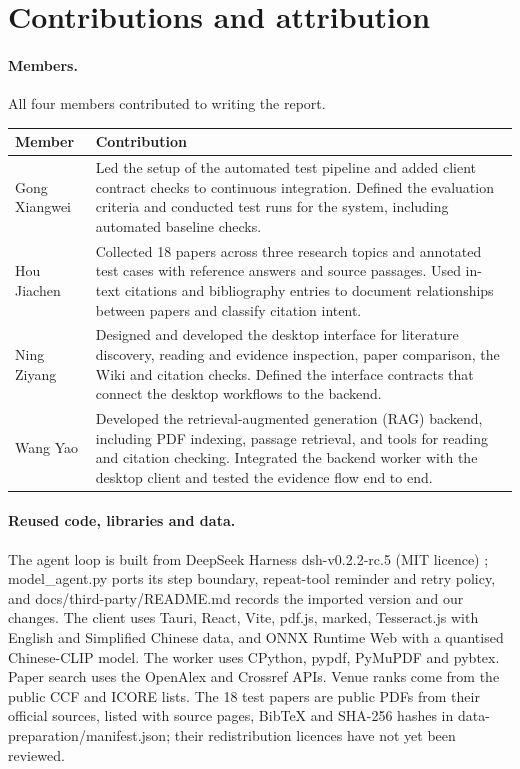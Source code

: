 \documentclass{article}
\newcommand{\code}[1]{{\ttfamily\small\hyphenchar\font=-1\relax #1}}
\begin{document}
\section{Contributions and attribution}
\label{sec:contrib}

\paragraph{Members.} All four members contributed to writing the report.

\medskip
{%
  \small
  \noindent\begin{tabularx}{\linewidth}{@{}lY@{}}
    \toprule
    Member & Contribution \\
    \midrule
    Gong Xiangwei & Led the setup of the automated test pipeline and added client contract checks to
    continuous integration. Defined the evaluation criteria and conducted test runs for the system,
    including automated baseline checks. \\
    Hou Jiachen & Collected 18 papers across three research topics and annotated test cases with
    reference answers and source passages. Used in-text citations and bibliography entries to
    document relationships between papers and classify citation intent. \\
    Ning Ziyang & Designed and developed the desktop interface for literature discovery, reading
    and evidence inspection, paper comparison, the Wiki and citation checks. Defined the interface
    contracts that connect the desktop workflows to the backend. \\
    Wang Yao & Developed the retrieval-augmented generation (RAG) backend, including PDF indexing,
    passage retrieval, and tools for reading and citation checking. Integrated the backend worker
    with the desktop client and tested the evidence flow end to end. \\
    \bottomrule
  \end{tabularx}\par
}

\paragraph{Reused code, libraries and data.}
The agent loop is built from DeepSeek Harness \code{dsh-v0.2.2-rc.5} (MIT licence) \citep{dsh};
\code{model\_agent.py} ports its step boundary, repeat-tool reminder and retry policy, and
\code{docs/third-party/README.md} records the imported version and our changes. The client uses Tauri,
React, Vite, pdf.js, marked, Tesseract.js with English and Simplified Chinese data, and ONNX Runtime
Web with a quantised Chinese-CLIP model. The worker uses CPython, pypdf, PyMuPDF and pybtex.
Paper search uses the OpenAlex and Crossref APIs. Venue ranks come from the public CCF and ICORE lists.
The 18 test papers are public PDFs from their official sources, listed with source pages, BibTeX and
SHA-256 hashes in \code{data-preparation/manifest.json}; their redistribution licences have not yet been
reviewed.
\end{document}
